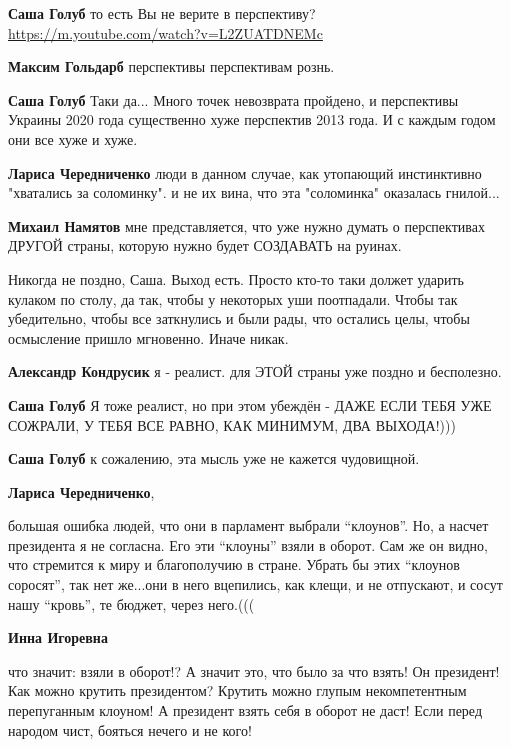 \begin{itemize}
\begin{itemize} %
\textbf{Саша Голуб} то есть Вы не верите в перспективу?
\url{https://m.youtube.com/watch?v=L2ZUATDNEMc}

\textbf{Максим Гольдарб} перспективы перспективам рознь.

\textbf{Саша Голуб} Таки да... Много точек невозврата пройдено, и перспективы Украины 2020 года существенно хуже перспектив 2013 года. И с каждым годом они все хуже и хуже.

\textbf{Лариса Чередниченко} люди в данном случае, как утопающий инстинктивно "хватались за соломинку". и не их вина, что эта "соломинка" оказалась гнилой...

\textbf{Михаил Намятов} мне представляется, что уже нужно думать о перспективах ДРУГОЙ страны, которую нужно будет СОЗДАВАТЬ на руинах.


Никогда не поздно, Саша. Выход есть. Просто кто-то таки должет ударить кулаком
по столу, да так, чтобы у некоторых уши поотпадали. Чтобы так убедительно,
чтобы все заткнулись и были рады, что остались целы, чтобы осмысление пришло
мгновенно. Иначе никак.

\textbf{Александр Кондрусик} я - реалист. для ЭТОЙ страны уже поздно и бесполезно.

\textbf{Саша Голуб} Я тоже реалист, но при этом убеждён - ДАЖЕ ЕСЛИ ТЕБЯ УЖЕ СОЖРАЛИ, У ТЕБЯ ВСЕ РАВНО, КАК МИНИМУМ, ДВА ВЫХОДА!)))

\textbf{Саша Голуб} к сожалению, эта мысль уже не кажется чудовищной.

\textbf{Лариса Чередниченко}, 

большая ошибка людей, что они в парламент выбрали \enquote{клоунов}. Но, а насчет
президента я не согласна. Его эти \enquote{клоуны} взяли в оборот. Сам же он видно, что
стремится к миру и благополучию в стране. Убрать бы этих \enquote{клоунов соросят},
так нет же...они в него вцепились, как клещи, и не отпускают, и сосут нашу
\enquote{кровь}, те бюджет, через него.(((


\textbf{Инна Игоревна} 

что значит: взяли в оборот!? А значит это, что было за что взять! Он
президент! Как можно крутить президентом? Крутить можно глупым некомпетентным
перепуганным клоуном! А президент взять себя в оборот не даст! Если перед
народом чист, бояться нечего и не кого!


\end{itemize}
\end{itemize}

